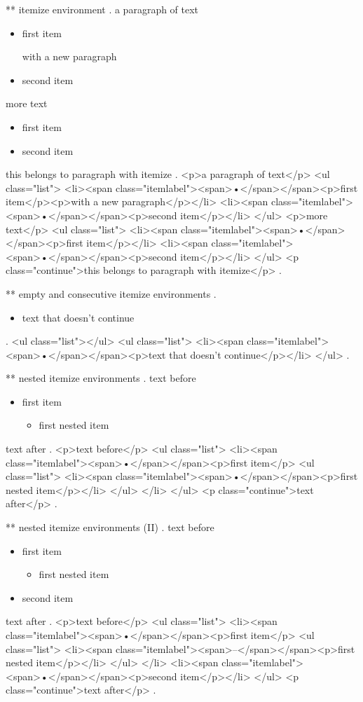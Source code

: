 ** itemize environment
.
a paragraph of text

\begin{itemize}
    \item first item

        with a new paragraph
    \item second item
\end{itemize}
%

more text

\begin{itemize}
    \item first item
    \item second item
\end{itemize}
this belongs to paragraph with itemize
.
<p>a paragraph of text</p>
<ul class="list">
<li><span class="itemlabel"><span>•</span></span><p>ﬁrst item</p><p>with a new paragraph</p></li>
<li><span class="itemlabel"><span>•</span></span><p>second item</p></li>
</ul>
<p>more text</p>
<ul class="list">
<li><span class="itemlabel"><span>•</span></span><p>ﬁrst item</p></li>
<li><span class="itemlabel"><span>•</span></span><p>second item</p></li>
</ul>
<p class="continue">this belongs to paragraph with itemize</p>
.


** empty and consecutive itemize environments
.
\begin{itemize}
\end{itemize}
\begin{itemize}
    \item text that doesn't continue
\end{itemize}
.
<ul class="list"></ul>
<ul class="list">
<li><span class="itemlabel"><span>•</span></span><p>text that doesn’t continue</p></li>
</ul>
.


** nested itemize environments
.
text before
\begin{itemize}
    \item first item
        \begin{itemize}
            \item first nested item
        \end{itemize}
\end{itemize}
text after
.
<p>text before</p>
<ul class="list">
<li><span class="itemlabel"><span>•</span></span><p>ﬁrst item</p>
<ul class="list">
<li><span class="itemlabel"><span>•</span></span><p>ﬁrst nested item</p></li>
</ul>
</li>
</ul>
<p class="continue">text after</p>
.


** nested itemize environments (II)
.
text before
\begin{itemize}
    \item first item
        \begin{itemize}
            \item first nested item
        \end{itemize}
    \item second item
\end{itemize}
text after
.
<p>text before</p>
<ul class="list">
<li><span class="itemlabel"><span>•</span></span><p>ﬁrst item</p>
<ul class="list">
<li><span class="itemlabel"><span>–</span></span><p>ﬁrst nested item</p></li>
</ul>
</li>
<li><span class="itemlabel"><span>•</span></span><p>second item</p></li>
</ul>
<p class="continue">text after</p>
.


